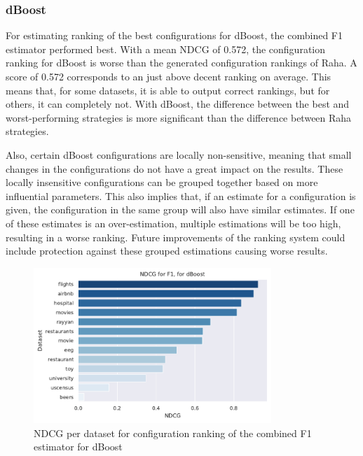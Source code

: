 \subsubsection{dBoost} 
For estimating ranking of the best configurations for dBoost, the combined F1 estimator performed best.
With a mean NDCG of 0.572, the configuration ranking for dBoost is worse than the generated configuration rankings of Raha. A score of 0.572 corresponds to an just above decent ranking on average. This means that, for some datasets, it is able to output correct rankings, but for others, it can completely not. With dBoost, the difference between the best and worst-performing strategies is more significant than the difference between Raha strategies. 

Also, certain dBoost configurations are locally non-sensitive, meaning that small changes in the configurations do not have a great impact on the results. These locally insensitive configurations can be grouped together based on more influential parameters. This also implies that, if an estimate for a configuration is given, the configuration in the same group will also have similar estimates.  If one of these estimates is an over-estimation, multiple estimations will be too high, resulting in a worse ranking. Future improvements of the ranking system could include protection against these grouped estimations causing worse results.

\begin{figure}[H]
    \centering
    \includegraphics[width=0.8\textwidth]{thesis/Figures/RQ3/15_combined_profiler_NDCG_dBoost.pdf}
    \caption{NDCG per dataset for configuration ranking of the combined F1 estimator for dBoost}
    \label{fig:ndcg_per_config_dBoost}
\end{figure}


